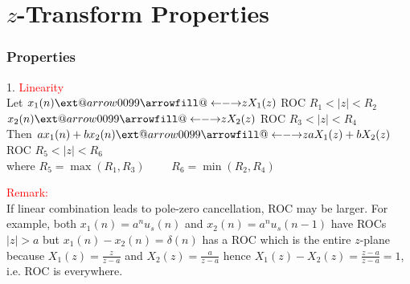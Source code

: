 \documentclass[mathserif, 10pt]{beamer} %
\makeatletter
\newcommand\xleftrightarrow[2][]{\ext@arrow 0099{\longleftrightarrowfill@}{#1}{#2}}
\def\longleftrightarrowfill@{\arrowfill@\leftarrow\relbar\rightarrow}
\makeatother
\begin{document}
\section{$z$-Transform Properties}
\frame
{
\frametitle{Properties}
1. \textcolor{red}{ Linearity}\\ \vspace{.1in}
Let $x_1(n) \xleftrightarrow[]{z} X_1(z) $  \hspace{0.2in} ROC  $R_1<|z|<R_2$\\
\hspace{.15in} $x_2(n) \xleftrightarrow[]{z} X_2(z) $  \hspace{0.2in} ROC  $R_3<|z|<R_4$ \\ \vspace{.2in}
Then $ax_1(n)+bx_2(n) \xleftrightarrow[]{z} aX_1(z)+bX_2(z)$ \hspace{0.2in}  ROC  $R_5<|z|<R_6$ \\ \vspace{.1in}
where $R_5 = \max(R_1,R_3)$~~~~ $ R_6=\min(R_2,R_4)$ \\ \vspace{.1in}

\textcolor{red}{Remark:} \\
If linear combination leads to pole-zero cancellation, ROC may be larger. For example,
both $x_1(n)=a^n u_s(n)$ and $x_2(n)=a^n u_s(n-1)$ have ROCs $|z|>a$ but $x_1(n)-x_2(n)=\delta(n)$ has a ROC
which is the entire $z$-plane because $X_1(z)= \frac{z}{z-a}$ and $X_2(z)= \frac{a}{z-a}$ hence
$X_1(z)-X_2(z)=\frac{z-a}{z-a}=1$, i.e. ROC is everywhere.



}
\end{document}
